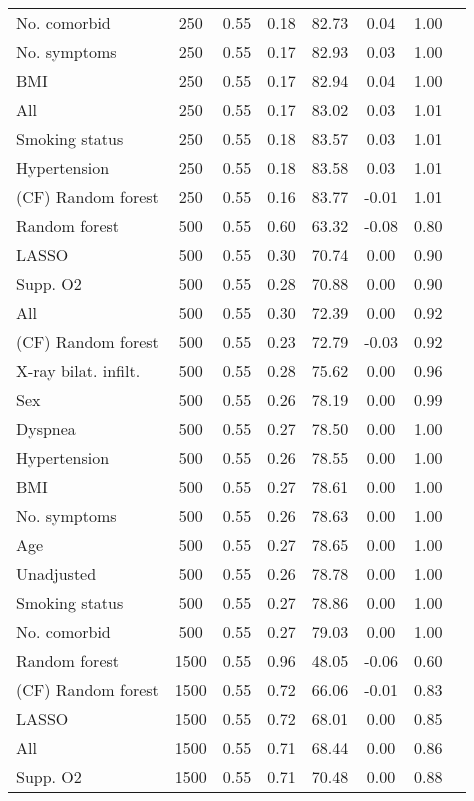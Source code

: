 \documentclass{article}
\begin{document}
{\begin{longtable}{lccccccc}
No. comorbid & 250 & 0.55 & 0.18 & 82.73 &  0.04 & 1.00 \\ 
No. symptoms & 250 & 0.55 & 0.17 & 82.93 &  0.03 & 1.00 \\ 
BMI & 250 & 0.55 & 0.17 & 82.94 &  0.04 & 1.00 \\ 
All & 250 & 0.55 & 0.17 & 83.02 &  0.03 & 1.01 \\ 
Smoking status & 250 & 0.55 & 0.18 & 83.57 &  0.03 & 1.01 \\ 
Hypertension & 250 & 0.55 & 0.18 & 83.58 &  0.03 & 1.01 \\ 
(CF) Random forest & 250 & 0.55 & 0.16 & 83.77 & -0.01 & 1.01 \\ \midrule() 
Random forest & 500 & 0.55 & 0.60 & 63.32 & -0.08 & 0.80 \\ 
LASSO & 500 & 0.55 & 0.30 & 70.74 &  0.00 & 0.90 \\ 
Supp. O2 & 500 & 0.55 & 0.28 & 70.88 &  0.00 & 0.90 \\ 
All & 500 & 0.55 & 0.30 & 72.39 &  0.00 & 0.92 \\ 
(CF) Random forest & 500 & 0.55 & 0.23 & 72.79 & -0.03 & 0.92 \\ 
X-ray bilat. infilt. & 500 & 0.55 & 0.28 & 75.62 &  0.00 & 0.96 \\ 
Sex & 500 & 0.55 & 0.26 & 78.19 &  0.00 & 0.99 \\ 
Dyspnea & 500 & 0.55 & 0.27 & 78.50 &  0.00 & 1.00 \\ 
Hypertension & 500 & 0.55 & 0.26 & 78.55 &  0.00 & 1.00 \\ 
BMI & 500 & 0.55 & 0.27 & 78.61 &  0.00 & 1.00 \\ 
No. symptoms & 500 & 0.55 & 0.26 & 78.63 &  0.00 & 1.00 \\ 
Age & 500 & 0.55 & 0.27 & 78.65 &  0.00 & 1.00 \\ 
Unadjusted & 500 & 0.55 & 0.26 & 78.78 &  0.00 & 1.00 \\ 
Smoking status & 500 & 0.55 & 0.27 & 78.86 &  0.00 & 1.00 \\ 
No. comorbid & 500 & 0.55 & 0.27 & 79.03 &  0.00 & 1.00 \\ \midrule() 
Random forest & 1500 & 0.55 & 0.96 & 48.05 & -0.06 & 0.60 \\ 
(CF) Random forest & 1500 & 0.55 & 0.72 & 66.06 & -0.01 & 0.83 \\ 
LASSO & 1500 & 0.55 & 0.72 & 68.01 &  0.00 & 0.85 \\ 
All & 1500 & 0.55 & 0.71 & 68.44 &  0.00 & 0.86 \\ 
Supp. O2 & 1500 & 0.55 & 0.71 & 70.48 &  0.00 & 0.88 \\ 

\end{longtable}}
\end{document}
